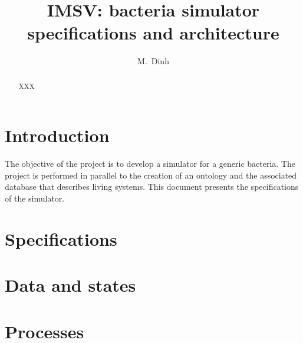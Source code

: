 \documentclass[12pt]{article}
\theoremstyle{definition}
\theoremstyle{remark}
\numberwithin{equation}{section}
\begin{document}
\normalem

\title{{IMSV}: bacteria simulator specifications and architecture}%
\author{M.~Dinh}%
\date{}%
\maketitle
\begin{abstract}
  XXX
\end{abstract}
\section{Introduction}

The objective of the project is to develop a simulator for a generic bacteria. The project is performed in parallel to the creation of an ontology and the associated database that describes living systems. This document presents the specifications of the simulator.


\section{Specifications}


\section{Data and states}


\section{Processes}

\end{document}
